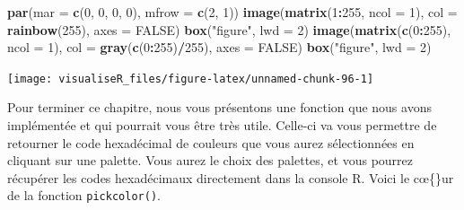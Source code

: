\documentclass[]{article}
\newenvironment{Shaded}{\begin{snugshade}}{\end{snugshade}}
\newcommand{\DataTypeTok}[1]{\textcolor[rgb]{0.13,0.29,0.53}{#1}}
\newcommand{\DecValTok}[1]{\textcolor[rgb]{0.00,0.00,0.81}{#1}}
\newcommand{\KeywordTok}[1]{\textcolor[rgb]{0.13,0.29,0.53}{\textbf{#1}}}
\newcommand{\NormalTok}[1]{#1}
\newcommand{\OperatorTok}[1]{\textcolor[rgb]{0.81,0.36,0.00}{\textbf{#1}}}
\newcommand{\OtherTok}[1]{\textcolor[rgb]{0.56,0.35,0.01}{#1}}
\newcommand{\StringTok}[1]{\textcolor[rgb]{0.31,0.60,0.02}{#1}}
\begin{document}
\begin{Shaded}
\begin{Highlighting}[]
\KeywordTok{par}\NormalTok{(}\DataTypeTok{mar =} \KeywordTok{c}\NormalTok{(}\DecValTok{0}\NormalTok{, }\DecValTok{0}\NormalTok{, }\DecValTok{0}\NormalTok{, }\DecValTok{0}\NormalTok{), }\DataTypeTok{mfrow =} \KeywordTok{c}\NormalTok{(}\DecValTok{2}\NormalTok{, }\DecValTok{1}\NormalTok{))}
\KeywordTok{image}\NormalTok{(}\KeywordTok{matrix}\NormalTok{(}\DecValTok{1}\OperatorTok{:}\DecValTok{255}\NormalTok{, }\DataTypeTok{ncol =} \DecValTok{1}\NormalTok{), }\DataTypeTok{col =} \KeywordTok{rainbow}\NormalTok{(}\DecValTok{255}\NormalTok{), }\DataTypeTok{axes =} \OtherTok{FALSE}\NormalTok{)}
\KeywordTok{box}\NormalTok{(}\StringTok{"figure"}\NormalTok{, }\DataTypeTok{lwd =} \DecValTok{2}\NormalTok{)}
\KeywordTok{image}\NormalTok{(}\KeywordTok{matrix}\NormalTok{(}\KeywordTok{c}\NormalTok{(}\DecValTok{0}\OperatorTok{:}\DecValTok{255}\NormalTok{), }\DataTypeTok{ncol =} \DecValTok{1}\NormalTok{), }\DataTypeTok{col =} \KeywordTok{gray}\NormalTok{(}\KeywordTok{c}\NormalTok{(}\DecValTok{0}\OperatorTok{:}\DecValTok{255}\NormalTok{)}\OperatorTok{/}\DecValTok{255}\NormalTok{), }\DataTypeTok{axes =} \OtherTok{FALSE}\NormalTok{)}
\KeywordTok{box}\NormalTok{(}\StringTok{"figure"}\NormalTok{, }\DataTypeTok{lwd =} \DecValTok{2}\NormalTok{)}
\end{Highlighting}
\end{Shaded}

\begin{center}\texttt{[image: visualiseR\_files/figure-latex/unnamed-chunk-96-1]} \end{center}

Pour terminer ce chapitre, nous vous présentons une fonction que nous avons implémentée et qui pourrait vous être très utile. Celle-ci va vous permettre de retourner le code hexadécimal de couleurs que vous aurez sélectionnées en cliquant sur une palette. Vous aurez le choix des palettes, et vous pourrez récupérer les codes hexadécimaux directement dans la console R.
Voici le c\oe\{\}ur de la fonction \texttt{pickcolor()}.
\end{document}
